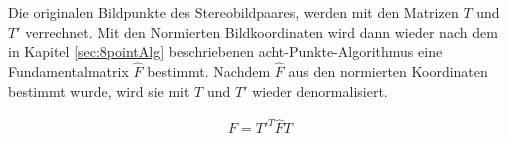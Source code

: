 Die originalen Bildpunkte des Stereobildpaares, werden mit den Matrizen $T$ und $T'$ verrechnet. Mit den Normierten Bildkoordinaten wird dann wieder nach dem in Kapitel \ref{sec:8pointAlg} beschriebenen acht-Punkte-Algorithmus eine Fundamentalmatrix $\hat{F}$ bestimmt\cite{HZ,HZ8,Ferid,Brooks}. Nachdem $\hat{F}$ aus den normierten Koordinaten bestimmt wurde, wird sie mit $T$ und $T'$ wieder denormalisiert.

\begin{gather}
	F = T'^T\hat{F}T
\end{gather}


%

%


%
%
%

